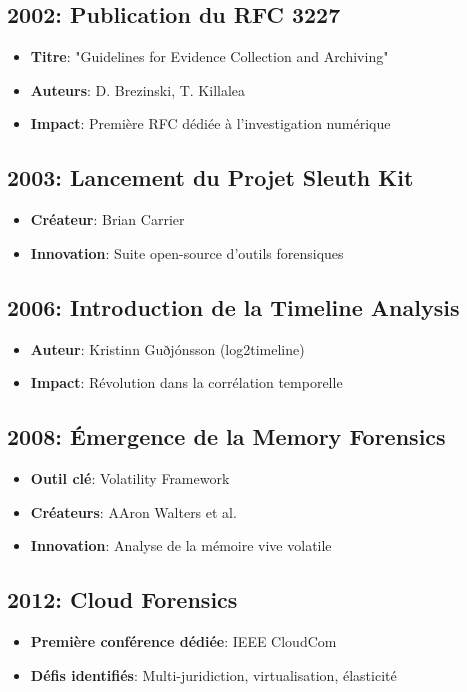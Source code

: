 \subsection{2002: Publication du RFC 3227}
\begin{itemize}
\item \textbf{Titre}: "Guidelines for Evidence Collection and Archiving"
\item \textbf{Auteurs}: D. Brezinski, T. Killalea
\item \textbf{Impact}: Première RFC dédiée à l'investigation numérique
\end{itemize}

\subsection{2003: Lancement du Projet Sleuth Kit}
\begin{itemize}
\item \textbf{Créateur}: Brian Carrier
\item \textbf{Innovation}: Suite open-source d'outils forensiques
\end{itemize}

\subsection{2006: Introduction de la Timeline Analysis}
\begin{itemize}
\item \textbf{Auteur}: Kristinn Guðjónsson (log2timeline)
\item \textbf{Impact}: Révolution dans la corrélation temporelle
\end{itemize}

\subsection{2008: Émergence de la Memory Forensics}
\begin{itemize}
\item \textbf{Outil clé}: Volatility Framework
\item \textbf{Créateurs}: AAron Walters et al.
\item \textbf{Innovation}: Analyse de la mémoire vive volatile
\end{itemize}

\subsection{2012: Cloud Forensics}
\begin{itemize}
\item \textbf{Première conférence dédiée}: IEEE CloudCom
\item \textbf{Défis identifiés}: Multi-juridiction, virtualisation, élasticité
\end{itemize}

